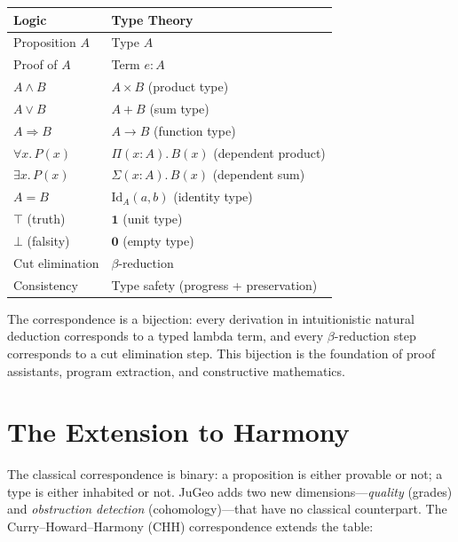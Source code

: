 \begin{center}
\renewcommand{\arraystretch}{1.2}
\begin{tabular}{ll}
\textbf{Logic} & \textbf{Type Theory} \\
\hline
Proposition $A$ & Type $A$ \\
Proof of $A$ & Term $e : A$ \\
$A \wedge B$ & $A \times B$ (product type) \\
$A \vee B$ & $A + B$ (sum type) \\
$A \Rightarrow B$ & $A \to B$ (function type) \\
$\forall x.\, P(x)$ & $\Pi(x:A).\, B(x)$ (dependent product) \\
$\exists x.\, P(x)$ & $\Sigma(x:A).\, B(x)$ (dependent sum) \\
$A = B$ & $\mathrm{Id}_A(a,b)$ (identity type) \\
$\top$ (truth) & $\mathbf{1}$ (unit type) \\
$\bot$ (falsity) & $\mathbf{0}$ (empty type) \\
Cut elimination & $\beta$-reduction \\
Consistency & Type safety (progress + preservation) \\
\end{tabular}
\end{center}

The correspondence is a bijection: every derivation in intuitionistic
natural deduction corresponds to a typed lambda term, and every
$\beta$-reduction step corresponds to a cut elimination step.  This
bijection is the foundation of proof assistants, program extraction,
and constructive mathematics.

\section{The Extension to Harmony}
\label{sec:chh-extension}

The classical correspondence is binary: a proposition is either
provable or not; a type is either inhabited or not.  JuGeo adds two
new dimensions---\emph{quality} (grades) and \emph{obstruction
detection} (cohomology)---that have no classical counterpart.  The
Curry--Howard--Harmony (CHH) correspondence extends the table:

